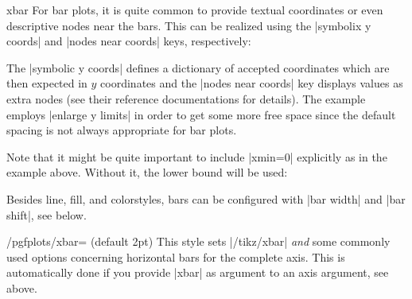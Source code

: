 {\begin{plottype}{xbar}
	For bar plots, it is quite common to provide textual coordinates or even descriptive nodes near the bars.
	This can be realized using the |symbolix y coords| and |nodes near coords| keys, respectively:
\begin{codeexample}[]
\end{codeexample}
	The |symbolic y coords| defines a dictionary of accepted coordinates which are then expected in $y$ coordinates and the |nodes near coords| key displays values as extra nodes (see their reference documentations for details). The example employs |enlarge y limits| in order to get some more free space since the default spacing is not always appropriate for bar plots.

	Note that it might be quite important to include |xmin=0| explicitly as in the example above. Without it, the lower bound will be used:
\begin{codeexample}[]
\end{codeexample}

	Besides line, fill, and colorstyles, bars can be configured with |bar width| and |bar shift|, see below.
\end{plottype}

\begin{stylekey}{/pgfplots/xbar= (default 2pt)}
	This style sets |/tikz/xbar| \emph{and} some commonly used options concerning horizontal bars for the complete axis. This is automatically done if you provide |xbar| as argument to an axis argument, see above.


\end{stylekey}}
